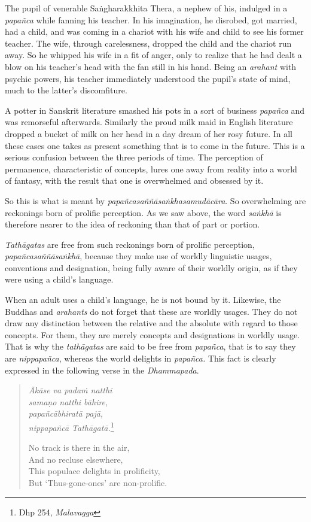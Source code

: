 The pupil of venerable Saṅgharakkhita Thera, a nephew of his, indulged in a \emph{papañca} while fanning his teacher. In his imagination, he disrobed, got married, had a child, and was coming in a chariot with his wife and child to see his former teacher. The wife, through carelessness, dropped the child and the chariot run away. So he whipped his wife in a fit of anger, only to realize that he had dealt a blow on his teacher's head with the fan still in his hand. Being an \emph{arahant} with psychic powers, his teacher immediately understood the pupil's state of mind, much to the latter's discomfiture.

A potter in Sanskrit literature smashed his pots in a sort of business \emph{papañca} and was remorseful afterwards. Similarly the proud milk maid in English literature dropped a bucket of milk on her head in a day dream of her rosy future. In all these cases one takes as present something that is to come in the future. This is a serious confusion between the three periods of time. The perception of permanence, characteristic of concepts, lures one away from reality into a world of fantasy, with the result that one is overwhelmed and obsessed by it.

So this is what is meant by \emph{papañcasaññāsaṅkhasamudācāra}. So overwhelming are reckonings born of prolific perception. As we saw above, the word \emph{saṅkhā} is therefore nearer to the idea of reckoning than that of part or portion.

\emph{Tathāgatas} are free from such reckonings born of prolific perception, \emph{papañcasaññāsaṅkhā}, because they make use of worldly linguistic usages, conventions and designation, being fully aware of their worldly origin, as if they were using a child's language.

When an adult uses a child's language, he is not bound by it. Likewise, the Buddhas and \emph{arahants} do not forget that these are worldly usages. They do not draw any distinction between the relative and the absolute with regard to those concepts. For them, they are merely concepts and designations in worldly usage. That is why the \emph{tathāgatas} are said to be free from \emph{papañca}, that is to say they are \emph{nippapañca}, whereas the world delights in \emph{papañca.} This fact is clearly expressed in the following verse in the \emph{Dhammapada}.

\begin{quote}
\emph{Ākāse va padaṁ natthi}\\
\emph{samaṇo natthi bāhire,}\\
\emph{papañcābhiratā pajā,}\\
\emph{nippapañcā Tathāgatā.}\footnote{Dhp 254, \emph{Malavagga}}

No track is there in the air,\\
And no recluse elsewhere,\\
This populace delights in prolificity,\\
But `Thus-gone-ones' are non-prolific.
\end{quote}

